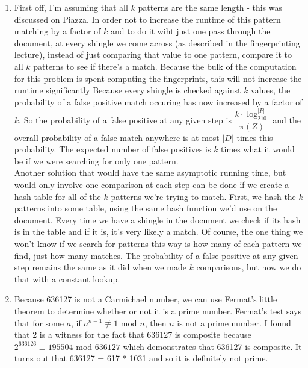 \documentclass{article}
\begin{document}
\begin{enumerate}
	\item First off, I'm assuming that all $k$ patterns are the same length - this was discussed on Piazza.  In order not to increase the runtime of this pattern matching by a factor of $k$ and to do it wiht just one pass through the document, at every shingle we come across (as described in the fingerprinting lecture), instead of just comparing that value to  one pattern, compare it to all $k$ patterns to see if there's a match.  Because the bulk of the computation for this problem is spent computing the fingerprints, this will not increase the runtime significantly  Because every shingle is checked against $k$ values, the probability of a false positive match occuring has now increased by a factor of $k$.  So the probability of a false positive at any given step is $\dfrac{k\cdot \log_210^{|P|}}{\pi(Z)}$ and the overall probability of a false match anywhere is at most $|D|$ times this probability. The expected number of false positives is $k$ times what it would be if we were searching for only one pattern. \\
	
	Another solution that would have the same asymptotic running time, but would only involve one comparison at each step can be done if we create a hash table for all of the $k$ patterns we're trying to match.  First, we hash the $k$ patterns into some table, using the same hash function we'd use on the document.  Every time we have a shingle in the document we check if its hash is in the table and if it is, it's very likely a match.  Of course, the one thing we won't know if we search for patterns this way is how many of each pattern we find, just how many matches.  The probability of a false positive at any given step remains the same as it did when we made $k$ comparisons, but now we do that with a constant lookup.   
	
	\item Because 636127 is not a Carmichael number, we can use Fermat's little theorem to determine whether or not it is a prime number.  Fermat's test says that for some $a$, if $a ^ {n-1} \not\equiv 1$ mod $ n$, then $n$ is not a prime number.  I found that 2 is a witness for the fact that 636127 is composite because $2 ^ {636126} \equiv 195504$ mod $ 636127$ which demonstrates that 636127 is composite. It turns out that 636127 = 617 * 1031 and so it is definitely not prime. \\
	

\end{enumerate}
\end{document}
